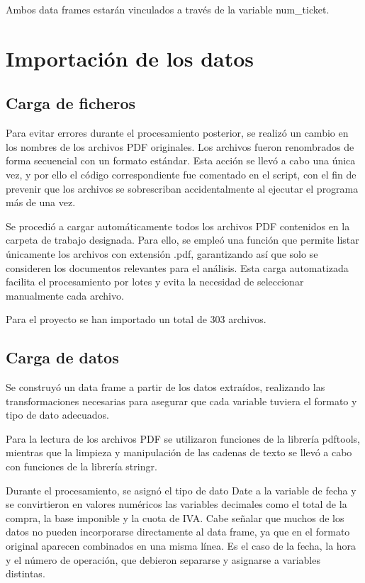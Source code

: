 \documentclass[,article,submit,moreauthors,pdftex]{Definitions/mdpi}
\begin{document}
Ambos data frames estarán vinculados a través de la variable
num\_ticket.

\hypertarget{importaciuxf3n-de-los-datos}{%
\section{Importación de los datos}\label{importaciuxf3n-de-los-datos}}

\hypertarget{carga-de-ficheros}{%
\subsection{Carga de ficheros}\label{carga-de-ficheros}}

Para evitar errores durante el procesamiento posterior, se realizó un
cambio en los nombres de los archivos PDF originales. Los archivos
fueron renombrados de forma secuencial con un formato estándar. Esta
acción se llevó a cabo una única vez, y por ello el código
correspondiente fue comentado en el script, con el fin de prevenir que
los archivos se sobrescriban accidentalmente al ejecutar el programa más
de una vez.

Se procedió a cargar automáticamente todos los archivos PDF contenidos
en la carpeta de trabajo designada. Para ello, se empleó una función que
permite listar únicamente los archivos con extensión .pdf, garantizando
así que solo se consideren los documentos relevantes para el análisis.
Esta carga automatizada facilita el procesamiento por lotes y evita la
necesidad de seleccionar manualmente cada archivo.

Para el proyecto se han importado un total de 303 archivos.

\hypertarget{carga-de-datos}{%
\subsection{Carga de datos}\label{carga-de-datos}}

Se construyó un data frame a partir de los datos extraídos, realizando
las transformaciones necesarias para asegurar que cada variable tuviera
el formato y tipo de dato adecuados.

Para la lectura de los archivos PDF se utilizaron funciones de la
librería pdftools, mientras que la limpieza y manipulación de las
cadenas de texto se llevó a cabo con funciones de la librería stringr.

Durante el procesamiento, se asignó el tipo de dato Date a la variable
de fecha y se convirtieron en valores numéricos las variables decimales
como el total de la compra, la base imponible y la cuota de IVA. Cabe
señalar que muchos de los datos no pueden incorporarse directamente al
data frame, ya que en el formato original aparecen combinados en una
misma línea. Es el caso de la fecha, la hora y el número de operación,
que debieron separarse y asignarse a variables distintas.
\end{document}

